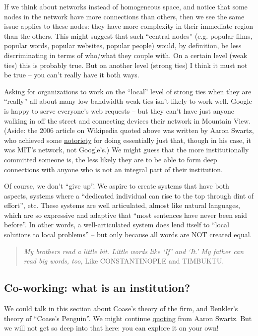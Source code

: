 If we think about networks instead of homogeneous space, and notice that
some nodes in the network have more connections than others, then we see
the same issue applies to these nodes: they have more complexity in
their immediate region than the others. This might suggest that such
``central nodes'' (e.g. popular films, popular words, popular websites,
popular people) would, by definition, be less discriminating in terms of
who/what they couple with. On a certain level (weak ties) this is
probably true. But on another level (strong ties) I think it must not be
true -- you can't really have it both ways.

Asking for organizations to work on the ``local'' level of strong ties
when they are ``really'' all about many low-bandwidth weak ties isn't
likely to work well. Google is happy to serve everyone's web requests --
but they can't have just anyone walking in off the street and connecting
devices their network in Mountain View. (Aside: the 2006 article on
Wikipedia quoted above was written by Aaron Swartz, who achieved some
\href{http://www.wired.com/threatlevel/2011/07/swartz-arrest/}{notoriety}
for doing essentially just that, though in his case, it was MIT's
network, not Google's.) We might guess that the more institutionally
committed someone is, the less likely they are to be able to form deep
connections with anyone who is not an integral part of their
institution.

Of course, we don't ``give up''. We aspire to create systems that have
both aspects, systems where a ``dedicated individual can rise to the top
through dint of effort'', etc. These systems are well articulated,
almost like natural languages, which are so expressive and adaptive that
``most sentences have never been said before''. In other words, a
well-articulated system does lend itself to ``local solutions to local
problems'' -- but only because all words are NOT created equal.

\begin{quote}
\emph{My brothers read a little bit. Little words like `If' and `It.' My
father can read big words, too,} Like CONSTANTINOPLE and TIMBUKTU.
\end{quote}
\subsection{Co-working: what is an institution?}

We could talk in this section about Coase's theory of the firm, and
Benkler's theory of ``Coase's Penguin''. We might continue
\href{http://www.aaronsw.com/weblog/perfectinstitutions}{quoting} from
Aaron Swartz. But we will not get so deep into that here: you can
explore it on your own!
